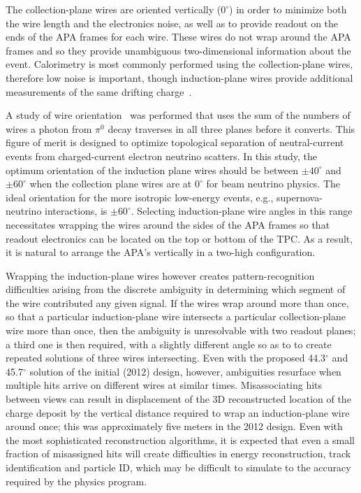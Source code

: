 The collection-plane wires are oriented vertically ($0^\circ$) in
order to minimize both the wire length and the electronics noise,
as well as to provide readout on the ends of the APA frames for
each wire.  These wires do not wrap around the APA frames and so
they provide unambiguous two-dimensional information about the
event.  Calorimetry is most commonly performed using the
collection-plane wires, therefore low noise is important, though
induction-plane wires provide additional measurements of the same
drifting charge~\cite{fd_9374, fd_8981, fd_9886}.

A study of wire orientation~\cite{wire-orientation} was performed that uses
the sum of the numbers of wires a photon from $\pi^0$ decay traverses
in all three planes before it converts.  This figure of merit is
designed to optimize topological separation of neutral-current events
from charged-current electron neutrino scatters.  In this study, the
optimum orientation of the induction plane wires should be between
$\pm40^\circ$ and $\pm60^\circ$ when the collection plane wires are at
$0^\circ$ for beam neutrino physics. The ideal orientation for the
more isotropic low-energy events, e.g., supernova-neutrino
interactions, is $\pm60^\circ$.  Selecting induction-plane wire angles
in this range necessitates wrapping the wires around the sides of the
APA frames so that readout electronics can be located on the top or
bottom of the TPC.  As a result, it is natural to arrange the APA's
vertically in a two-high configuration.

Wrapping the induction-plane wires however creates pattern-recognition
difficulties arising from the discrete ambiguity in determining which segment of
the wire contributed any given signal.  If the wires wrap around more
than once, so that a particular induction-plane wire intersects a
particular collection-plane wire more than once, then the ambiguity is
unresolvable with two readout planes; a third one is then required, with
a slightly different angle so as to to create repeated solutions of
three wires intersecting.  Even with the proposed 44.3$^\circ$ and
45.7$^\circ$ solution of the initial (2012) design, however, ambiguities
resurface when multiple hits arrive on different wires at similar
times.  Misassociating hits between views can result in 
displacement of the 3D reconstructed location of the charge
deposit by the vertical distance required to wrap an induction-plane
wire around once; this was approximately five meters in the 2012 design.
Even with the most sophisticated reconstruction algorithms, it is
expected that even a small fraction of misassigned hits will create
difficulties in energy reconstruction, track identification and
particle ID, which may be difficult to simulate to the accuracy
required by the physics program.

